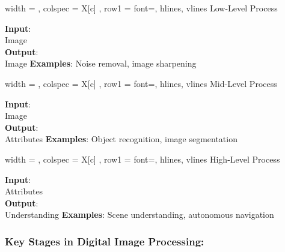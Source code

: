 \noindent
\begin{minipage}[t]{0.3\linewidth}
  \begin{tblr}{
    width   = \linewidth,
    colspec = { X[c] },
    row{1}  = { font=\bfseries },
    hlines, vlines
  }
    Low-Level Process \\
    \parbox[c][12em][b]{\linewidth}{%
      \textbf{Input}:\\ Image\\
      \textbf{Output}:\\ Image
      \vfill
      \textbf{Examples}: Noise removal, image sharpening
    }
  \end{tblr}
\end{minipage}\hfill
\begin{minipage}[t]{0.3\linewidth}
  \begin{tblr}{
    width   = \linewidth,
    colspec = { X[c] },
    row{1}  = { font=\bfseries },
    hlines, vlines
  }
    Mid-Level Process \\
    \parbox[c][12em][b]{\linewidth}{%
      \textbf{Input}:\\ Image\\
      \textbf{Output}:\\ Attributes
      \vfill
      \textbf{Examples}: Object recognition, image segmentation
    }
  \end{tblr}
\end{minipage}\hfill
\begin{minipage}[t]{0.3\linewidth}
  \begin{tblr}{
    width   = \linewidth,
    colspec = { X[c] },
    row{1}  = { font=\bfseries },
    hlines, vlines
  }
    High-Level Process \\
    \parbox[c][12em][b]{\linewidth}{%
      \textbf{Input}:\\ Attributes\\
      \textbf{Output}:\\ Understanding
      \vfill
      \textbf{Examples}: Scene understanding, autonomous navigation
    }
  \end{tblr}
\end{minipage}

\subsubsection*{Key Stages in Digital Image Processing:}
  
